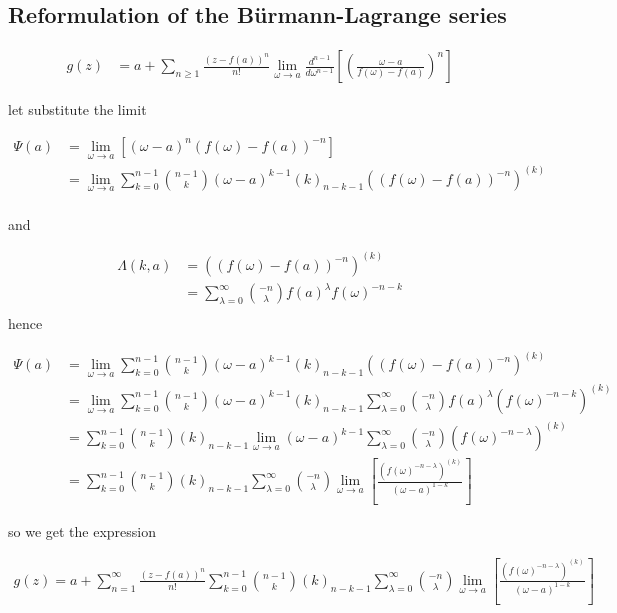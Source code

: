 \subsection{Reformulation of the Bürmann-Lagrange series}

\begin{align}
        g(z) &= a + \sum_{n \geq 1} \frac{(z-f(a))^n}{n!}
        \lim_{\omega \to a}\frac{d^{n-1}}{d\omega^{n-1}}
        \left[ \left(\frac{\omega - a}{f(\omega) - f(a)} \right)^n\right] 
\end{align}

let substitute the limit

\begin{align}
        \Psi(a) &= \lim_{\omega \to a}\left[ (\omega-a)^n(f(\omega)
        - f(a))^{-n}\right] \\
        &= \lim_{\omega \to a}\sum_{k=0}^{n-1}\binom{n-1}{k}(\omega 
        - a)^{k-1}(k)_{n-k-1}\left( (f(\omega) - f(a))^{-n}\right)^{(k)}\\
\end{align}

and

\begin{align}
        \Lambda(k, a)& = \left( (f(\omega) - f(a))^{-n}\right)^{(k)} \\
        &= \sum_{\lambda = 0}^{\infty}\binom{-n}{\lambda}f(a)^\lambda
        f(\omega)^{-n-k} \\
\end{align}
hence

\begin{align}
        \Psi(a) &= \lim_{\omega \to a}\sum_{k=0}^{n-1}\binom{n-1}{k}(\omega
        - a)^{k-1}(k)_{n-k-1}\left( (f(\omega) - f(a))^{-n}\right)^{(k)}\\
        &= \lim_{\omega \to a}\sum_{k=0}^{n-1}\binom{n-1}{k}(\omega -
        a)^{k-1}(k)_{n-k-1}\sum_{\lambda = 0}^{\infty}\binom{-n}{
        \lambda}f(a)^\lambda \left(f(\omega)^{-n-k}\right)^{(k)} \\
        &= \sum_{k=0}^{n-1}\binom{n-1}{k}(k)_{n-k-1}\lim_{\omega 
        \to a}(\omega -a)^{k-1}\sum_{\lambda = 0}^\infty \binom{-n
        }{\lambda}\left( f(\omega)^{-n-\lambda}\right)^{(k)} \\
        &= \sum_{k=0}^{n-1}\binom{n-1}{k}(k)_{n-k-1} \sum_{\lambda 
        = 0}^{\infty}\binom{-n}{\lambda} \lim_{\omega \to a}\left[
        \frac{(f(\omega)^{-n-\lambda})^{(k)}}{(\omega - a)^{1-k}}\right]
\end{align}

so we get the expression

\begin{align}
        g(z) = a+ \sum_{n=1}^{\infty} \frac{(z-f(a))^n}{n!}\sum_{k=0}^{n-1}
        \binom{n-1}{k}(k)_{n-k-1}\sum_{\lambda=0}^\infty \binom{-n}{\lambda}
        \lim_{\omega \to a}\left[ \frac{(f(\omega)^{-n-\lambda})^{(k)}}{(\omega - a)^{1-k}}\right]
\end{align}
